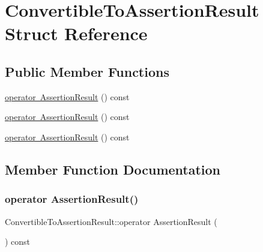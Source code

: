 \hypertarget{struct_convertible_to_assertion_result}{}\section{Convertible\+To\+Assertion\+Result Struct Reference}
\label{struct_convertible_to_assertion_result}
\subsection*{Public Member Functions}
\begin{DoxyCompactItemize}
\item 
\mbox{\hyperlink{struct_convertible_to_assertion_result_a0f816f2f25ecaf29a95b3cfd4033e105}{operator Assertion\+Result}} () const
\item 
\mbox{\hyperlink{struct_convertible_to_assertion_result_a0f816f2f25ecaf29a95b3cfd4033e105}{operator Assertion\+Result}} () const
\item 
\mbox{\hyperlink{struct_convertible_to_assertion_result_a0f816f2f25ecaf29a95b3cfd4033e105}{operator Assertion\+Result}} () const
\end{DoxyCompactItemize}


\subsection{Member Function Documentation}
\mbox{\label{struct_convertible_to_assertion_result_a0f816f2f25ecaf29a95b3cfd4033e105}} 
\subsubsection{\texorpdfstring{operator AssertionResult()}{operator AssertionResult()}\hspace{0.1cm}{\footnotesize\ttfamily [1/3]}}
{\footnotesize\ttfamily Convertible\+To\+Assertion\+Result\+::operator Assertion\+Result (\begin{DoxyParamCaption}{ }\end{DoxyParamCaption}) const\hspace{0.3cm}{\ttfamily [inline]}}

\mbox{\label{struct_convertible_to_assertion_result_a0f816f2f25ecaf29a95b3cfd4033e105}} 
